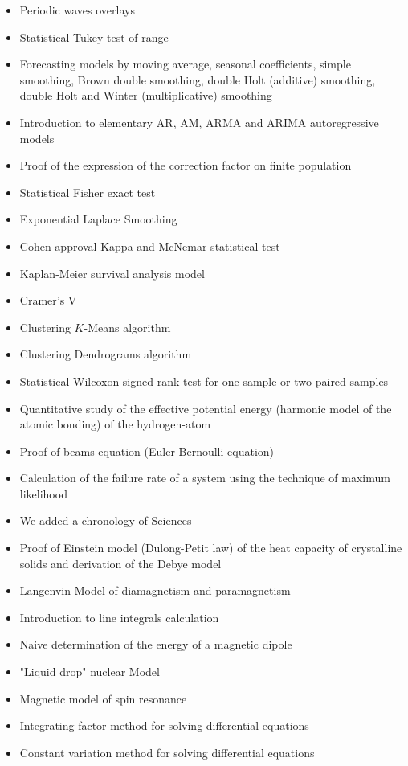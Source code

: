 \documentclass[12pt,a4paper,twoside,openright]{report}
\theoremstyle{definition}
\theoremstyle{itexmp}
\numberwithin{equation}{section}
\begin{document}
\begin{itemize}
\begin{itemize}[noitemsep]
				\item Periodic waves overlays
				\item Statistical Tukey test of range
				\item Forecasting models by moving average, seasonal coefficients, simple smoothing, Brown double smoothing, double Holt (additive) smoothing, double Holt and Winter (multiplicative) smoothing
				\item Introduction to elementary  AR, AM, ARMA and ARIMA autoregressive models
				\item Proof of the expression of the correction factor on finite population
				\item Statistical Fisher exact test
				\item Exponential Laplace Smoothing
				\item Cohen approval Kappa and McNemar statistical test
				\item Kaplan-Meier survival analysis model
				\item Cramer's V
				\item Clustering $K$-Means algorithm
				\item Clustering Dendrograms algorithm
				\item Statistical Wilcoxon signed rank test for one sample or two paired samples
				\item Quantitative study of the effective potential energy (harmonic model of the atomic bonding) of the hydrogen-atom
				\item Proof of beams equation (Euler-Bernoulli equation)
				\item Calculation of the failure rate of a system using the technique of maximum likelihood
				\item We added a chronology of Sciences
				\item Proof of Einstein model (Dulong-Petit law) of the heat capacity of crystalline solids and derivation of the Debye model
				\item Langenvin Model of diamagnetism and paramagnetism
				\item Introduction to line integrals calculation
				\item Naive determination of the energy of a magnetic dipole
				\item "Liquid drop" nuclear Model 
				\item Magnetic model of spin resonance
				\item Integrating factor method for solving differential equations
				\item Constant variation method for solving differential equations

\end{itemize}
\end{itemize}
\end{document}

